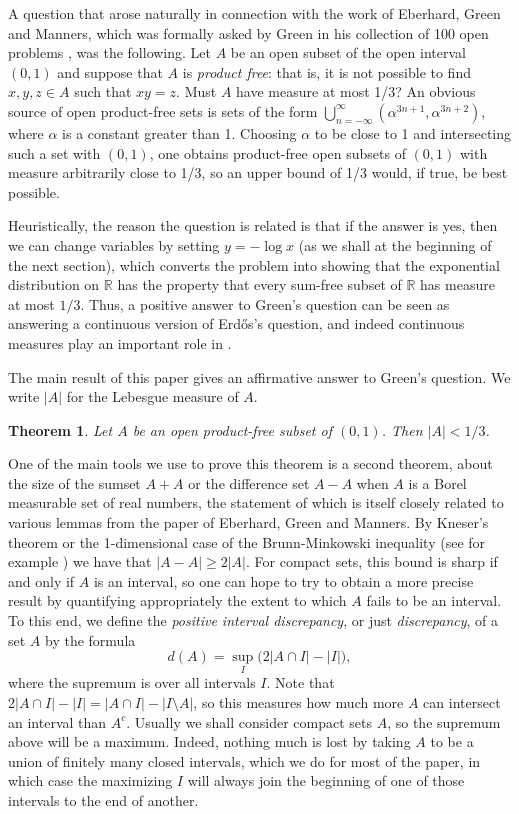 \documentclass[11pt,reqno]{amsart}
\newtheorem{theorem}{Theorem}[section]
\theoremstyle{definition}
\def\R{\mathbb{R}}
\def\a{\alpha}
\begin{document}
A question that arose naturally in connection with the work of Eberhard, Green and Manners, which was formally asked by Green in his collection of 100 open problems \cite{GreenOpenProblems}, was the following. Let $A$ be an open subset of the open interval $(0,1)$ and suppose that $A$ is \emph{product free}: that is, it is not possible to find $x,y,z\in A$ such that $xy=z$. Must $A$ have measure at most 1/3? An obvious source of open product-free sets is sets of the form $\bigcup_{n=-\infty}^\infty(\a^{3n+1},\a^{3n+2})$, where $\a$ is a constant greater than 1. Choosing $\a$ to be close to 1 and intersecting such a set with $(0,1)$, one obtains product-free open subsets of $(0,1)$ with measure arbitrarily close to 1/3, so an upper bound of 1/3 would, if true, be best possible. 

Heuristically, the reason the question is related is that if the answer is yes, then we can change variables by setting $y=-\log x$ (as we shall at the beginning of the next section), which converts the problem into showing that the exponential distribution on $\R$ has the property that every sum-free subset of $\R$ has measure at most $1/3$. Thus, a positive answer to Green's question can be seen as answering a continuous version of Erd\H os's question, and indeed continuous measures play an important role in \cite{EberhardGreenManners2014}.

The main result of this paper gives an affirmative answer to Green's question. We write $|A|$ for the Lebesgue measure of $A$.

\begin{theorem} \label{main1} Let $A$ be an open product-free subset of $(0,1)$. Then $|A|< 1/3$.
\end{theorem}

\noindent One of the main tools we use to prove this theorem is a second theorem, about the size of the sumset $A+A$ or the difference set $A-A$ when $A$ is a Borel measurable set of real numbers, the statement of which is itself closely related to various lemmas from the paper of Eberhard, Green and Manners. By Kneser's theorem \cite{Kneser1956} or the 1-dimensional case of the Brunn-Minkowski inequality (see for example \cite{Gardner2002}) we have that $|A-A|\geq 2|A|$. For compact sets, this bound is sharp if and only if $A$ is an interval, so one can hope to try to obtain a more precise result by quantifying appropriately the extent to which $A$ fails to be an interval. To this end, we define the \emph{positive interval discrepancy}, or just \emph{discrepancy}, of a set $A$ by the formula
\[d(A)=\sup_I \big(2|A\cap I|-|I|\big),\]
where the supremum is over all intervals $I$. Note that $2|A\cap I|-|I|=|A\cap I|-|I\setminus A|$, so this measures how much more $A$ can intersect an interval than $A^c$. Usually we shall consider compact sets $A$, so the supremum above will be a maximum. Indeed, nothing much is lost by taking $A$ to be a union of finitely many closed intervals, which we do for most of the paper, in which case the maximizing $I$ will always join the beginning of one of those intervals to the end of another. 
\end{document}
